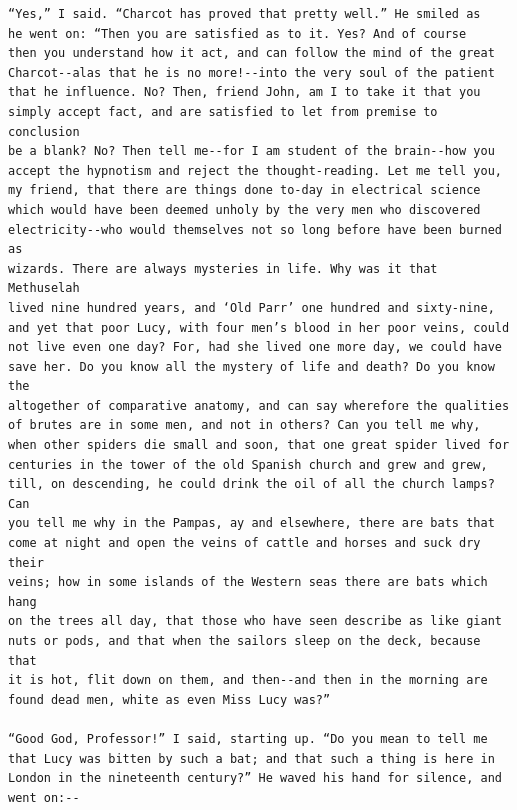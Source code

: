 \documentclass{article}
\begin{document}
\begin{verbatim}
“Yes,” I said. “Charcot has proved that pretty well.” He smiled as
he went on: “Then you are satisfied as to it. Yes? And of course
then you understand how it act, and can follow the mind of the great
Charcot--alas that he is no more!--into the very soul of the patient
that he influence. No? Then, friend John, am I to take it that you
simply accept fact, and are satisfied to let from premise to conclusion
be a blank? No? Then tell me--for I am student of the brain--how you
accept the hypnotism and reject the thought-reading. Let me tell you,
my friend, that there are things done to-day in electrical science
which would have been deemed unholy by the very men who discovered
electricity--who would themselves not so long before have been burned as
wizards. There are always mysteries in life. Why was it that Methuselah
lived nine hundred years, and ‘Old Parr’ one hundred and sixty-nine,
and yet that poor Lucy, with four men’s blood in her poor veins, could
not live even one day? For, had she lived one more day, we could have
save her. Do you know all the mystery of life and death? Do you know the
altogether of comparative anatomy, and can say wherefore the qualities
of brutes are in some men, and not in others? Can you tell me why,
when other spiders die small and soon, that one great spider lived for
centuries in the tower of the old Spanish church and grew and grew,
till, on descending, he could drink the oil of all the church lamps? Can
you tell me why in the Pampas, ay and elsewhere, there are bats that
come at night and open the veins of cattle and horses and suck dry their
veins; how in some islands of the Western seas there are bats which hang
on the trees all day, that those who have seen describe as like giant
nuts or pods, and that when the sailors sleep on the deck, because that
it is hot, flit down on them, and then--and then in the morning are
found dead men, white as even Miss Lucy was?”

“Good God, Professor!” I said, starting up. “Do you mean to tell me
that Lucy was bitten by such a bat; and that such a thing is here in
London in the nineteenth century?” He waved his hand for silence, and
went on:--


\end{verbatim}
\end{document}
